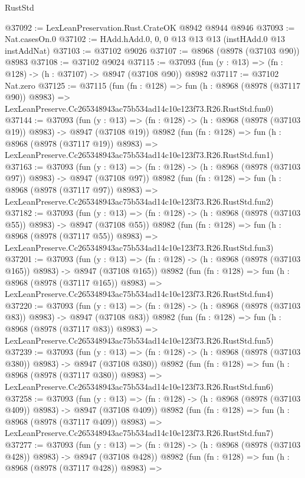 \begin{lexlean}{RustStd}
\begin{coremodule}
@37092 := LexLeanPreservation.Rust.CrateOK @8942 @8944 @8946
@37093 := Nat.casesOn.{0}
@37102 := HAdd.hAdd.{0, 0, 0} @13 @13 @13 (instHAdd.{0} @13 instAddNat)
@37103 := @37102 @9026
@37107 := @8968 (@8978 (@37103 @90)) @8983
@37108 := @37102 @9024
@37115 := @37093 (fun (y : @13) => (fn : @128) -> (h : @37107) -> @8947 (@37108 @90)) @8982
@37117 := @37102 Nat.zero
@37125 := @37115
    (fun (fn : @128) =>
    fun (h : @8968 (@8978 (@37117 @90)) @8983) =>
    LexLeanPreserve.Cc265348943ac75b534ad14c10e123f73.R26.RustStd.fun0)
@37144 := @37093
    (fun (y : @13) => (fn : @128) -> (h : @8968 (@8978 (@37103 @19)) @8983) -> @8947 (@37108 @19))
    @8982
    (fun (fn : @128) =>
    fun (h : @8968 (@8978 (@37117 @19)) @8983) =>
    LexLeanPreserve.Cc265348943ac75b534ad14c10e123f73.R26.RustStd.fun1)
@37163 := @37093
    (fun (y : @13) => (fn : @128) -> (h : @8968 (@8978 (@37103 @97)) @8983) -> @8947 (@37108 @97))
    @8982
    (fun (fn : @128) =>
    fun (h : @8968 (@8978 (@37117 @97)) @8983) =>
    LexLeanPreserve.Cc265348943ac75b534ad14c10e123f73.R26.RustStd.fun2)
@37182 := @37093
    (fun (y : @13) => (fn : @128) -> (h : @8968 (@8978 (@37103 @55)) @8983) -> @8947 (@37108 @55))
    @8982
    (fun (fn : @128) =>
    fun (h : @8968 (@8978 (@37117 @55)) @8983) =>
    LexLeanPreserve.Cc265348943ac75b534ad14c10e123f73.R26.RustStd.fun3)
@37201 := @37093
    (fun (y : @13) => (fn : @128) -> (h : @8968 (@8978 (@37103 @165)) @8983) -> @8947 (@37108 @165))
    @8982
    (fun (fn : @128) =>
    fun (h : @8968 (@8978 (@37117 @165)) @8983) =>
    LexLeanPreserve.Cc265348943ac75b534ad14c10e123f73.R26.RustStd.fun4)
@37220 := @37093
    (fun (y : @13) => (fn : @128) -> (h : @8968 (@8978 (@37103 @83)) @8983) -> @8947 (@37108 @83))
    @8982
    (fun (fn : @128) =>
    fun (h : @8968 (@8978 (@37117 @83)) @8983) =>
    LexLeanPreserve.Cc265348943ac75b534ad14c10e123f73.R26.RustStd.fun5)
@37239 := @37093
    (fun (y : @13) => (fn : @128) -> (h : @8968 (@8978 (@37103 @380)) @8983) -> @8947 (@37108 @380))
    @8982
    (fun (fn : @128) =>
    fun (h : @8968 (@8978 (@37117 @380)) @8983) =>
    LexLeanPreserve.Cc265348943ac75b534ad14c10e123f73.R26.RustStd.fun6)
@37258 := @37093
    (fun (y : @13) => (fn : @128) -> (h : @8968 (@8978 (@37103 @409)) @8983) -> @8947 (@37108 @409))
    @8982
    (fun (fn : @128) =>
    fun (h : @8968 (@8978 (@37117 @409)) @8983) =>
    LexLeanPreserve.Cc265348943ac75b534ad14c10e123f73.R26.RustStd.fun7)
@37277 := @37093
    (fun (y : @13) => (fn : @128) -> (h : @8968 (@8978 (@37103 @428)) @8983) -> @8947 (@37108 @428))
    @8982
    (fun (fn : @128) =>
    fun (h : @8968 (@8978 (@37117 @428)) @8983) =>

\end{coremodule}
\end{lexlean}
